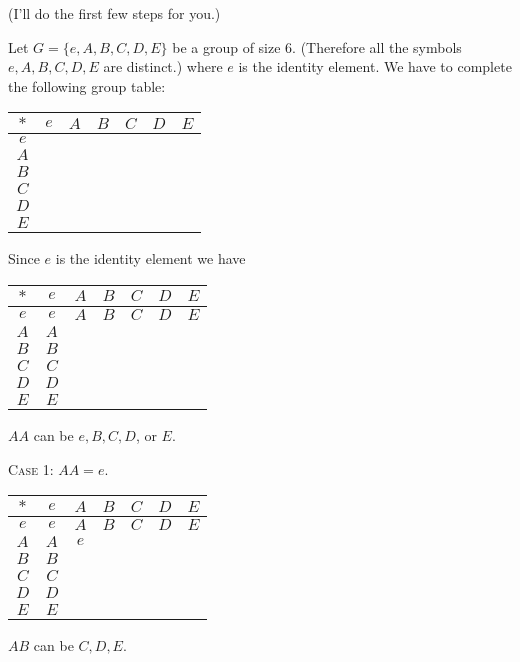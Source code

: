 (I'll do the first few steps for you.)

Let $G = \{e, A, B, C, D, E\}$ be a group of size 6. (Therefore
all the symbols $e, A, B, C, D, E$ are distinct.)
where $e$ is the identity element.
We have to complete the following group table:
\begin{longtable}{|c||c|c|c|c|c|c|}
\hline
$*$ & $e$ & $A$ & $B$ & $C$ & $D$ & $E$ \\ \hline\hline
$e$ &     &     &     &     &     &     \\ \hline
$A$ &     &     &     &     &     &     \\ \hline
$B$ &     &     &     &     &     &     \\ \hline
$C$ &     &     &     &     &     &     \\ \hline
$D$ &     &     &     &     &     &     \\ \hline
$E$ &     &     &     &     &     &     \\ \hline
\end{longtable}
Since $e$ is the identity element we have
\begin{longtable}{|c||c|c|c|c|c|c|}
\hline
$*$ & $e$ & $A$ & $B$ & $C$ & $D$ & $E$ \\ \hline\hline
$e$ & $e$ & $A$ & $B$ & $C$ & $D$ & $E$ \\ \hline
$A$ & $A$ &     &     &     &     &     \\ \hline
$B$ & $B$ &     &     &     &     &     \\ \hline
$C$ & $C$ &     &     &     &     &     \\ \hline
$D$ & $D$ &     &     &     &     &     \\ \hline
$E$ & $E$ &     &     &     &     &     \\ \hline
\end{longtable}
$AA$ can be $e, B, C, D$, or $E$.

\textsc{Case 1:} $AA = e$.
\begin{longtable}{|c||c|c|c|c|c|c|}
\hline
$*$ & $e$ & $A$ & $B$ & $C$ & $D$ & $E$ \\ \hline\hline
$e$ & $e$ & $A$ & $B$ & $C$ & $D$ & $E$ \\ \hline
$A$ & $A$ & $e$ &     &     &     &     \\ \hline
$B$ & $B$ &     &     &     &     &     \\ \hline
$C$ & $C$ &     &     &     &     &     \\ \hline
$D$ & $D$ &     &     &     &     &     \\ \hline
$E$ & $E$ &     &     &     &     &     \\ \hline
\end{longtable}
$AB$ can be $C,D,E$.

